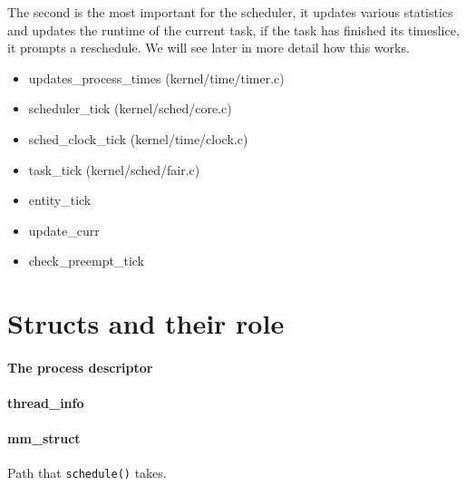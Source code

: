 \documentclass[10pt]{book}
\begin{document}
The second is the most important for the scheduler, it updates various statistics and updates the runtime of the current task, if the task has finished its timeslice, it prompts a reschedule. We will see later in more detail how this works. %
\begin{itemize} %
\item updates\_process\_times (kernel/time/timer.c)
\item scheduler\_tick (kernel/sched/core.c)
\item sched\_clock\_tick (kernel/time/clock.c)
\item task\_tick (kernel/sched/fair.c)
\item entity\_tick 
\item update\_curr
\item check\_preempt\_tick
\end{itemize}

\section{Structs and their role}
\paragraph{The process descriptor}
\paragraph{thread\_info}
\paragraph{mm\_struct}

Path that \verb|schedule()| takes.

\end{document}
